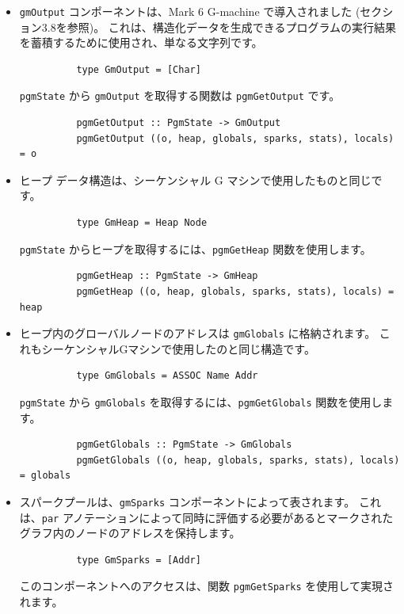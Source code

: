\documentclass{jbook}
\begin{document}
\begin{itemize}
	\item \texttt{gmOutput} コンポーネントは、Mark 6 G-machine で導入されました (セクション3.8を参照)。
	      これは、構造化データを生成できるプログラムの実行結果を蓄積するために使用され、単なる文字列です。
	      \begin{verbatim}
          type GmOutput = [Char]
        \end{verbatim}
	      \texttt{pgmState} から \texttt{gmOutput} を取得する関数は \texttt{pgmGetOutput} です。
	      \begin{verbatim}
          pgmGetOutput :: PgmState -> GmOutput
          pgmGetOutput ((o, heap, globals, sparks, stats), locals) = o
        \end{verbatim}
	\item ヒープ データ構造は、シーケンシャル G マシンで使用したものと同じです。
	      \begin{verbatim}
          type GmHeap = Heap Node
        \end{verbatim}
	      \texttt{pgmState} からヒープを取得するには、\texttt{pgmGetHeap} 関数を使用します。
	      \begin{verbatim}
          pgmGetHeap :: PgmState -> GmHeap
          pgmGetHeap ((o, heap, globals, sparks, stats), locals) = heap
        \end{verbatim}
	\item ヒープ内のグローバルノードのアドレスは \texttt{gmGlobals} に格納されます。
	      これもシーケンシャルGマシンで使用したのと同じ構造です。
	      \begin{verbatim}
          type GmGlobals = ASSOC Name Addr
        \end{verbatim}
	      \texttt{pgmState} から \texttt{gmGlobals} を取得するには、\texttt{pgmGetGlobals} 関数を使用します。
	      \begin{verbatim}
          pgmGetGlobals :: PgmState -> GmGlobals
          pgmGetGlobals ((o, heap, globals, sparks, stats), locals) = globals
        \end{verbatim}
	\item スパークプールは、\texttt{gmSparks} コンポーネントによって表されます。
	      これは、\texttt{par} アノテーションによって同時に評価する必要があるとマークされたグラフ内のノードのアドレスを保持します。
	      \begin{verbatim}
          type GmSparks = [Addr]
        \end{verbatim}
	      このコンポーネントへのアクセスは、関数 \texttt{pgmGetSparks} を使用して実現されます。

\end{itemize}
\end{document}

